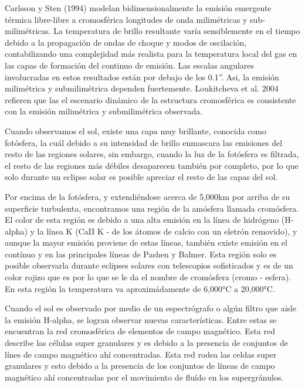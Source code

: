 \documentclass[9pt]{book}
\begin{document}
Carlsson y Sten (1994) modelan bidimensionalmente la emisi\'on emergente t\'ermica libre-libre a cromosf\'erica longitudes de onda milim\'etricas y sub-milim\'etricas. La temperatura de brillo resultante var\'ia sensiblemente en el tiempo debido a la propagaci\'on de ondas de choque y modos de oscilaci\'on, contabilizando una complejidad m\'as realista para la temperatura local del gas en las capas de formaci\'on del continuo de emisi\'on. Las escalas angulares involucradas en estos resultados est\'an por debajo de los 0.1''. Asi, la emisi\'on milim\'etrica y submilim\'etrica dependen fuertemente. Loukitcheva et al. 2004 refieren que las el escenario din\'amico de la estructura cromosf\'erica es consistente con la emisi\'on milim\'etrica y submilim\'etrica observada.




Cuando observamos el sol, existe una capa muy brillante, conocida como fot\'osfera, la cu\'al debido a su intensidad de brillo enmascara las emisiones del resto de las regiones solares, sin embargo, cuando la luz de la fot\'osfera es filtrada, el resto de las regiones m\'as d\'ebiles desaparecen tambi\'en por completo, por lo que solo durante un eclipse solar es posible apreciar el resto de las capas del sol.

Por encima de la fot\'osfera, y extendi\'endose acerca de 5,000km por arriba de su superficie turbulenta, encontramos una regi\'on de la am\'osfera llamada crom\'osfera. El color de esta regi\'on es debido a una alta emisi\'on en la l\'inea de hidr\'ogeno (H-alpha) y la l\'inea K (CaII K - de los \'atomos de calcio con un eletr\'on removido), y aunque la mayor emisi\'on proviene de estas l\'ineas, tambi\'en existe emisi\'on en el cont\'inuo y en las principales l\'ineas de Pashen y Balmer.  Esta regi\'on solo es posible observarla durante eclipses solares con telescopios sofisticados y es de un color rojizo que es por lo que se le da el nombre de crom\'osfera (cromo - esfera). En esta regi\'on la temperatura va aproxim\'adamente de 6,000°C a 20,000°C.  

Cuando el sol es observado por medio de un espectr\'ografo o alg\'un filtro que aisle la emisi\'on H-alpha, se logran observar nuevas caracter\'isticas. Entre estas se encuentran la red cromosf\'erica de elementos de campo magn\'etico. Esta red describe las c\'elulas super granulares y es debido a la presencia de conjuntos de l\'ines de campo magn\'etico ah\'i concentradas. Esta red rodea las celdas super granulares y esto debido a la presencia de los conjuntos de l\'ineas de campo magn\'etico ah\'i concentradas por el movimiento de flu\'ido en los supergr\'anulos.
\end{document}
